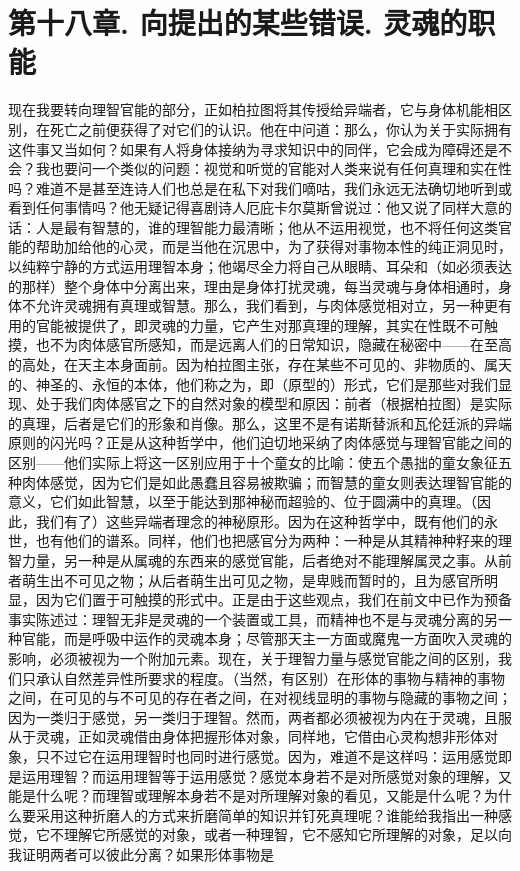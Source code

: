 
\section{第十八章. 向提出的某些错误. 灵魂的职能}

现在我要转向理智官能的部分，正如柏拉图将其传授给异端者，它与身体机能相区别，在死亡之前便获得了对它们的认识。他在中问道：那么，你认为关于实际拥有这件事又当如何？如果有人将身体接纳为寻求知识中的同伴，它会成为障碍还是不会？我也要问一个类似的问题：视觉和听觉的官能对人类来说有任何真理和实在性吗？难道不是甚至连诗人们也总是在私下对我们嘀咕，我们永远无法确切地听到或看到任何事情吗？他无疑记得喜剧诗人厄庇卡尔莫斯曾说过：他又说了同样大意的话：人是最有智慧的，谁的理智能力最清晰；他从不运用视觉，也不将任何这类官能的帮助加给他的心灵，而是当他在沉思中，为了获得对事物本性的纯正洞见时，以纯粹宁静的方式运用理智本身；他竭尽全力将自己从眼睛、耳朵和（如必须表达的那样）整个身体中分离出来，理由是身体打扰灵魂，每当灵魂与身体相通时，身体不允许灵魂拥有真理或智慧。那么，我们看到，与肉体感觉相对立，另一种更有用的官能被提供了，即灵魂的力量，它产生对那真理的理解，其实在性既不可触摸，也不为肉体感官所感知，而是远离人们的日常知识，隐藏在秘密中——在至高的高处，在天主本身面前。因为柏拉图主张，存在某些不可见的、非物质的、属天的、神圣的、永恒的本体，他们称之为，即（原型的）形式，它们是那些对我们显现、处于我们肉体感官之下的自然对象的模型和原因：前者（根据柏拉图）是实际的真理，后者是它们的形象和肖像。那么，这里不是有诺斯替派和瓦伦廷派的异端原则的闪光吗？正是从这种哲学中，他们迫切地采纳了肉体感觉与理智官能之间的区别——他们实际上将这一区别应用于十个童女的比喻：使五个愚拙的童女象征五种肉体感觉，因为它们是如此愚蠢且容易被欺骗；而智慧的童女则表达理智官能的意义，它们如此智慧，以至于能达到那神秘而超验的、位于圆满中的真理。（因此，我们有了）这些异端者理念的神秘原形。因为在这种哲学中，既有他们的永世，也有他们的谱系。同样，他们也把感官分为两种：一种是从其精神种籽来的理智力量，另一种是从属魂的东西来的感觉官能，后者绝对不能理解属灵之事。从前者萌生出不可见之物；从后者萌生出可见之物，是卑贱而暂时的，且为感官所明显，因为它们置于可触摸的形式中。正是由于这些观点，我们在前文中已作为预备事实陈述过：理智无非是灵魂的一个装置或工具，而精神也不是与灵魂分离的另一种官能，而是呼吸中运作的灵魂本身；尽管那天主一方面或魔鬼一方面吹入灵魂的影响，必须被视为一个附加元素。现在，关于理智力量与感觉官能之间的区别，我们只承认自然差异性所要求的程度。（当然，有区别）在形体的事物与精神的事物之间，在可见的与不可见的存在者之间，在对视线显明的事物与隐藏的事物之间；因为一类归于感觉，另一类归于理智。然而，两者都必须被视为内在于灵魂，且服从于灵魂，正如灵魂借由身体把握形体对象，同样地，它借由心灵构想非形体对象，只不过它在运用理智时也同时进行感觉。因为，难道不是这样吗：运用感觉即是运用理智？而运用理智等于运用感觉？感觉本身若不是对所感觉对象的理解，又能是什么呢？而理智或理解本身若不是对所理解对象的看见，又能是什么呢？为什么要采用这种折磨人的方式来折磨简单的知识并钉死真理呢？谁能给我指出一种感觉，它不理解它所感觉的对象，或者一种理智，它不感知它所理解的对象，足以向我证明两者可以彼此分离？如果形体事物是